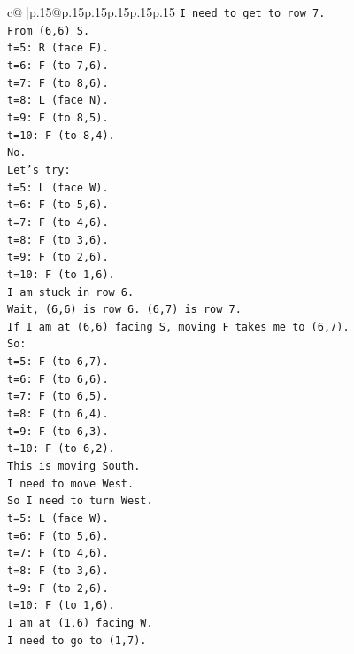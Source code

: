 \documentclass{article}
\begin{document}
{\begin{supertabular}{c@{$\;$}|p{.15\linewidth}@{}p{.15\linewidth}p{.15\linewidth}p{.15\linewidth}p{.15\linewidth}p{.15\linewidth}}
{{{\texttt{I need to get to row 7.} \\
\texttt{From (6,6) S.} \\
\texttt{t=5: R (face E).} \\
\texttt{t=6: F (to 7,6).} \\
\texttt{t=7: F (to 8,6).} \\
\texttt{t=8: L (face N).} \\
\texttt{t=9: F (to 8,5).} \\
\texttt{t=10: F (to 8,4).} \\
\texttt{No.} \\
\texttt{Let's try:} \\
\texttt{t=5: L (face W).} \\
\texttt{t=6: F (to 5,6).} \\
\texttt{t=7: F (to 4,6).} \\
\texttt{t=8: F (to 3,6).} \\
\texttt{t=9: F (to 2,6).} \\
\texttt{t=10: F (to 1,6).} \\
\texttt{I am stuck in row 6.} \\
\texttt{Wait, (6,6) is row 6. (6,7) is row 7.} \\
\texttt{If I am at (6,6) facing S, moving F takes me to (6,7).} \\
\texttt{So:} \\
\texttt{t=5: F (to 6,7).} \\
\texttt{t=6: F (to 6,6).} \\
\texttt{t=7: F (to 6,5).} \\
\texttt{t=8: F (to 6,4).} \\
\texttt{t=9: F (to 6,3).} \\
\texttt{t=10: F (to 6,2).} \\
\texttt{This is moving South.} \\
\texttt{I need to move West.} \\
\texttt{So I need to turn West.} \\
\texttt{t=5: L (face W).} \\
\texttt{t=6: F (to 5,6).} \\
\texttt{t=7: F (to 4,6).} \\
\texttt{t=8: F (to 3,6).} \\
\texttt{t=9: F (to 2,6).} \\
\texttt{t=10: F (to 1,6).} \\
\texttt{I am at (1,6) facing W.} \\
\texttt{I need to go to (1,7).} \\
}}}
\end{supertabular}}
\end{document}
